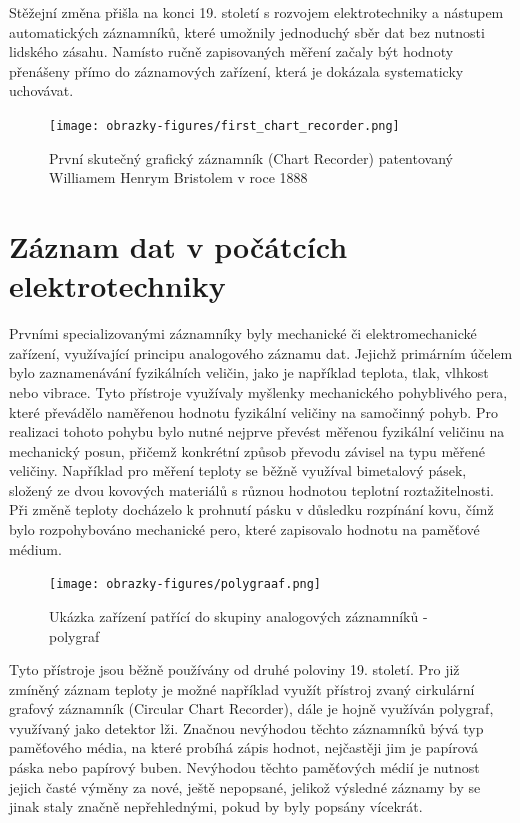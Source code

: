 Stěžejní změna přišla na konci 19. století s rozvojem elektrotechniky a nástupem automatických záznamníků, které umožnily jednoduchý sběr dat bez nutnosti lidského zásahu. Namísto ručně zapisovaných měření začaly být hodnoty přenášeny přímo do záznamových zařízení, která je dokázala systematicky uchovávat. \cite{origin_of_chart_recorders}

\begin{figure}[h] %
    \centering
    \texttt{[image: obrazky-figures/first\_chart\_recorder.png]}
    \caption{První skutečný grafický záznamník (Chart Recorder) patentovaný Williamem Henrym Bristolem v roce 1888 \cite{bristol_chart_recorders}}
    \label{fig:chart_recorder}  
\end{figure}

\section{Záznam dat v počátcích elektrotechniky}
\label{zaznam}
Prvními specializovanými záznamníky byly mechanické či elektromechanické zařízení, využívající principu analogového záznamu dat. Jejichž primárním účelem bylo zaznamenávání fyzikálních veličin, jako je například teplota, tlak, vlhkost nebo vibrace. Tyto přístroje využívaly myšlenky mechanického pohyblivého pera, které převádělo naměřenou hodnotu fyzikální veličiny na samočinný pohyb. Pro realizaci tohoto pohybu bylo nutné nejprve převést měřenou fyzikální veličinu na mechanický posun, přičemž konkrétní způsob převodu závisel na typu měřené veličiny. Například pro měření teploty se běžně využíval bimetalový pásek, složený ze dvou kovových materiálů s různou hodnotou teplotní roztažitelnosti. Při změně teploty docházelo k prohnutí pásku v důsledku rozpínání kovu, čímž bylo rozpohybováno mechanické pero, které zapisovalo hodnotu na paměťové médium.


\begin{figure}[h] %
    \centering
    \texttt{[image: obrazky-figures/polygraaf.png]}
    \caption{Ukázka zařízení patřící do skupiny analogových záznamníků - polygraf \cite{polygraph_picture}}
    \label{fig:polygraaf}
\end{figure}


Tyto přístroje jsou běžně používány od druhé poloviny 19. století. Pro již zmíněný záznam teploty je možné například využít přístroj zvaný cirkulární grafový záznamník (Circular Chart Recorder), dále je hojně využíván polygraf, využívaný jako detektor lži. Značnou nevýhodou těchto záznamníků bývá typ paměťového média, na které probíhá zápis hodnot, nejčastěji jim je papírová páska nebo papírový buben. Nevýhodou těchto paměťových médií je nutnost jejich časté výměny za nové, ještě nepopsané, jelikož výsledné záznamy by se jinak staly značně nepřehlednými, pokud by byly popsány vícekrát. \cite{origin_of_chart_recorders}


